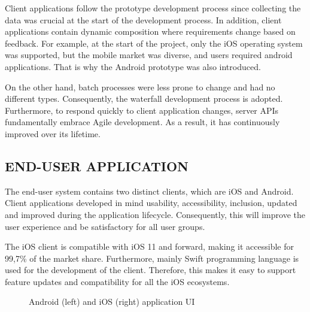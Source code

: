 Client applications follow the prototype development process since collecting the data was crucial at the start of the development process. In addition, client applications contain dynamic composition where requirements change based on feedback. For example, at the start of the project, only the iOS operating system was supported, but the mobile market was diverse, and users required android applications. That is why the Android prototype was also introduced.

On the other hand, batch processes were less prone to change and had no different types. Consequently, the waterfall development process is adopted. Furthermore, to respond quickly to client application changes, server APIs fundamentally embrace Agile development. As a result, it has continuously improved over its lifetime. 

\subsection{END-USER APPLICATION}

The end-user system contains two distinct clients, which are iOS and Android. Client applications developed in mind usability, accessibility, inclusion, updated and improved during the application lifecycle. Consequently, this will improve the user experience and be satisfactory for all user groups.

The iOS client is compatible with iOS 11 and forward, making it accessible for 99,7\% of the market share. Furthermore, mainly Swift programming language is used for the development of the client. Therefore, this makes it easy to support feature updates and compatibility for all the iOS ecosystems. 

\begin{figure}[htbp]
\centering
{}
\caption{Android (left) and iOS (right) application UI}
\label{fig:UserApplicationUI}
\end{figure}

